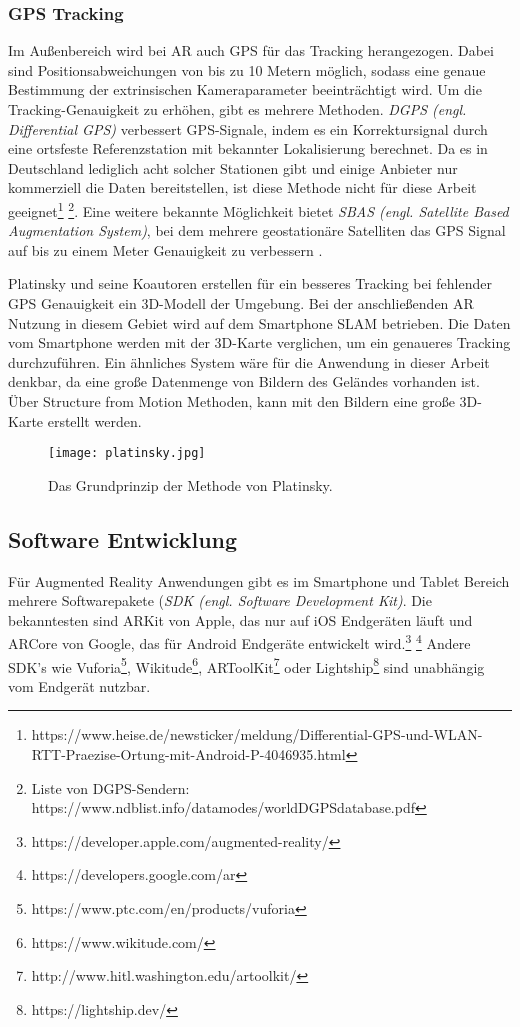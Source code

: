 \subsubsection{GPS Tracking}
Im Außenbereich wird bei AR auch GPS für das Tracking herangezogen. Dabei sind Positionsabweichungen von bis zu 10 Metern möglich, sodass eine genaue Bestimmung der extrinsischen Kameraparameter beeinträchtigt wird. Um die Tracking-Genauigkeit zu erhöhen, gibt es mehrere Methoden. \textit{DGPS (engl. Differential GPS)} verbessert GPS-Signale, indem es ein Korrektursignal durch eine ortsfeste Referenzstation mit bekannter Lokalisierung berechnet. Da es in Deutschland lediglich acht solcher Stationen gibt und einige Anbieter nur kommerziell die Daten bereitstellen, ist diese Methode nicht für diese Arbeit geeignet\footnote{https://www.heise.de/newsticker/meldung/Differential-GPS-und-WLAN-RTT-Praezise-Ortung-mit-Android-P-4046935.html} \footnote{Liste von DGPS-Sendern: https://www.ndblist.info/datamodes/worldDGPSdatabase.pdf}. Eine weitere bekannte Möglichkeit bietet \textit{SBAS (engl. Satellite Based Augmentation System)}, bei dem mehrere geostationäre Satelliten das GPS Signal auf bis zu einem Meter Genauigkeit zu verbessern \cite*{doerner}.

Platinsky und seine Koautoren\cite{platinsky} erstellen für ein besseres Tracking bei fehlender GPS Genauigkeit ein 3D-Modell der Umgebung. Bei der anschließenden AR Nutzung in diesem Gebiet wird auf dem Smartphone SLAM betrieben. Die Daten vom Smartphone werden mit der 3D-Karte verglichen, um ein genaueres Tracking durchzuführen. Ein ähnliches System wäre für die Anwendung in dieser Arbeit denkbar, da eine große Datenmenge von Bildern des Geländes vorhanden ist. Über Structure from Motion Methoden, kann mit den Bildern eine große 3D-Karte erstellt werden.

\begin{figure}[h]
    \centering
    \texttt{[image: platinsky.jpg]}
    \caption{Das Grundprinzip der Methode von Platinsky.}
    \label{fig:PlatinskyPrinzip}
\end{figure}

\subsection{Software Entwicklung}
Für Augmented Reality Anwendungen gibt es im Smartphone und Tablet Bereich mehrere Softwarepakete (\textit{SDK (engl. Software Development Kit)}. Die bekanntesten sind ARKit von Apple, das nur auf iOS Endgeräten läuft und ARCore von Google, das für Android Endgeräte entwickelt wird.\footnote{https://developer.apple.com/augmented-reality/} \footnote{https://developers.google.com/ar} Andere SDK's wie Vuforia\footnote{https://www.ptc.com/en/products/vuforia}, Wikitude\footnote{https://www.wikitude.com/}, ARToolKit\footnote{http://www.hitl.washington.edu/artoolkit/} oder Lightship\footnote{https://lightship.dev/} sind unabhängig vom Endgerät nutzbar.  

